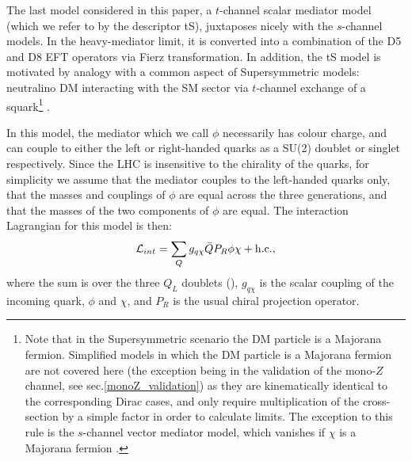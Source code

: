 
The last model considered in this paper, a $t$-channel scalar mediator model (which we refer to by the descriptor tS), juxtaposes nicely with the $s$-channel models. In the heavy-mediator limit, it is converted into a combination of the D5 and D8 EFT operators via Fierz transformation. In addition, the tS model is motivated by analogy with a common aspect of Supersymmetric models: neutralino DM interacting with the SM sector via $t$-channel exchange of a squark\footnote{Note that in the Supersymmetric scenario the DM particle is a Majorana fermion. Simplified models in which the DM particle is a Majorana fermion are not covered here (the exception being in the validation of the mono-$Z$ channel, see sec.\ref{monoZ_validation}) as they are kinematically identical to the corresponding Dirac cases, and only require multiplication of the cross-section by a simple factor in order to calculate limits. The exception to this rule is the $s$-channel vector mediator model, which vanishes if $\chi$ is a Majorana fermion \cite{METSig}.} \cite{SUSYDM}.

In this model, the mediator which we call $\phi$ necessarily has colour charge, and can couple to either the left or right-handed quarks as a SU(2) doublet or singlet respectively. Since the LHC is insensitive to the chirality of the quarks, for simplicity we assume that the mediator couples to the left-handed quarks only, that the masses and couplings of $\phi$ are equal across the three generations, and that the masses of the two components of $\phi$ are equal. The interaction Lagrangian for this model is then:
\begin{equation}
\label{L_int_tS}
\mathcal{L}_{int} = \sum_{Q} g_{q \chi} \bar{Q} P_R \phi \chi + {\rm h.c.},
\end{equation}
where the sum is over the three $Q_L$ doublets (), $g_{q \chi}$ is the scalar coupling of the incoming quark, $\phi$ and $\chi$, and $P_R$ is the usual chiral projection operator. 

